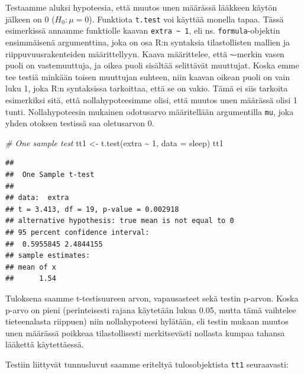\documentclass[
]{book}
\newenvironment{Shaded}{\begin{snugshade}}{\end{snugshade}}
\newcommand{\AttributeTok}[1]{\textcolor[rgb]{0.77,0.63,0.00}{#1}}
\newcommand{\CommentTok}[1]{\textcolor[rgb]{0.56,0.35,0.01}{\textit{#1}}}
\newcommand{\DecValTok}[1]{\textcolor[rgb]{0.00,0.00,0.81}{#1}}
\newcommand{\FunctionTok}[1]{\textcolor[rgb]{0.00,0.00,0.00}{#1}}
\newcommand{\NormalTok}[1]{#1}
\newcommand{\OtherTok}[1]{\textcolor[rgb]{0.56,0.35,0.01}{#1}}
\newcommand{\SpecialCharTok}[1]{\textcolor[rgb]{0.00,0.00,0.00}{#1}}
\begin{document}
Testaamme aluksi hypoteesia, että muutos unen määrässä lääkkeen käytön jälkeen on 0 (\(H_0 : \mu = 0\)). Funktiota \texttt{t.test} voi käyttää monella tapaa. Tässä esimerkissä annamme funktiolle kaavan \texttt{extra\ \textasciitilde{}\ 1}, eli ns. \texttt{formula}-objektin ensimmäisenä argumenttina, joka on osa R:n syntaksia tilastollisten mallien ja riippuvuusrakenteiden määrittellyyn. Kaava määrittelee, että \texttt{\textasciitilde{}}-merkin vasen puoli on vastemuuttuja, ja oikea puoli sisältää selittävät muuttujat. Koska emme tee testiä minkään toisen muuttujan suhteen, niin kaavan oikean puoli on vain luku 1, joka R:n syntaksissa tarkoittaa, että se on vakio. Tämä ei siis tarkoita esimerkiksi sitä, että nollahypoteesimme olisi, että muutos unen määrässä olisi 1 tunti. Nollahypoteesin mukainen odotusarvo määritellään argumentilla \texttt{mu}, joka yhden otoksen testissä saa oletusarvon 0.

\begin{Shaded}
\begin{Highlighting}[]
\CommentTok{\# One sample test}
\NormalTok{tt1 }\OtherTok{\textless{}{-}} \FunctionTok{t.test}\NormalTok{(extra }\SpecialCharTok{\textasciitilde{}} \DecValTok{1}\NormalTok{, }\AttributeTok{data =}\NormalTok{ sleep)}
\NormalTok{tt1}
\end{Highlighting}
\end{Shaded}

\begin{verbatim}
## 
##  One Sample t-test
## 
## data:  extra
## t = 3.413, df = 19, p-value = 0.002918
## alternative hypothesis: true mean is not equal to 0
## 95 percent confidence interval:
##  0.5955845 2.4844155
## sample estimates:
## mean of x 
##      1.54
\end{verbatim}

Tuloksena saamme t-testisuureen arvon, vapausasteet sekä testin p-arvon. Koska p-arvo on pieni (perinteisesti rajana käytetään lukua 0.05, mutta tämä vaihtelee tieteenalasta riippuen) niin nollahypoteesi hylätään, eli testin mukaan muutos unen määrässä poikkeaa tilastollisesti merkitsevästi nollasta kumpaa tahansa lääkettä käytettäessä.

Testiin liittyvät tunnusluvut saamme eriteltyä tulosobjektista \texttt{tt1} seuraavasti:

\begin{Shaded}
\end{Shaded}
\end{document}
